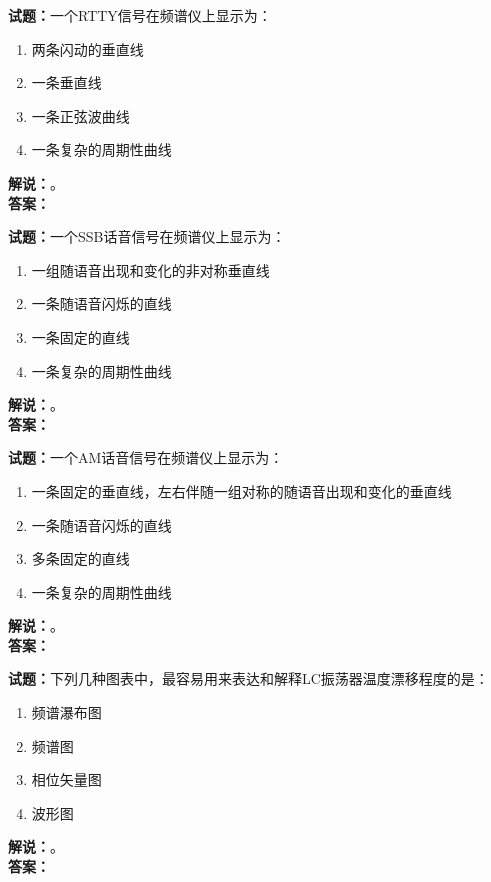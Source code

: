\documentclass{ctexbook}
\begin{document}
\bigskip




\noindent\textbf{试题：}一个RTTY信号在频谱仪上显示为：
\begin{enumerate}[leftmargin=3em]
\item 两条闪动的垂直线
\item 一条垂直线
\item 一条正弦波曲线
\item 一条复杂的周期性曲线
\end{enumerate}
\noindent\textbf{解说：}\textbf{}。\\\noindent\textbf{答案：}

\bigskip




\noindent\textbf{试题：}一个SSB话音信号在频谱仪上显示为：
\begin{enumerate}[leftmargin=3em]
\item 一组随语音出现和变化的非对称垂直线
\item 一条随语音闪烁的直线
\item 一条固定的直线
\item 一条复杂的周期性曲线
\end{enumerate}
\noindent\textbf{解说：}\textbf{}。\\\noindent\textbf{答案：}

\bigskip




\noindent\textbf{试题：}一个AM话音信号在频谱仪上显示为：
\begin{enumerate}[leftmargin=3em]
\item 一条固定的垂直线，左右伴随一组对称的随语音出现和变化的垂直线
\item 一条随语音闪烁的直线
\item 多条固定的直线
\item 一条复杂的周期性曲线
\end{enumerate}
\noindent\textbf{解说：}\textbf{}。\\\noindent\textbf{答案：}

\bigskip




\noindent\textbf{试题：}下列几种图表中，最容易用来表达和解释LC振荡器温度漂移程度的是：
\begin{enumerate}[leftmargin=3em]
\item 频谱瀑布图
\item 频谱图
\item 相位矢量图
\item 波形图
\end{enumerate}
\noindent\textbf{解说：}\textbf{}。\\\noindent\textbf{答案：}
\end{document}
